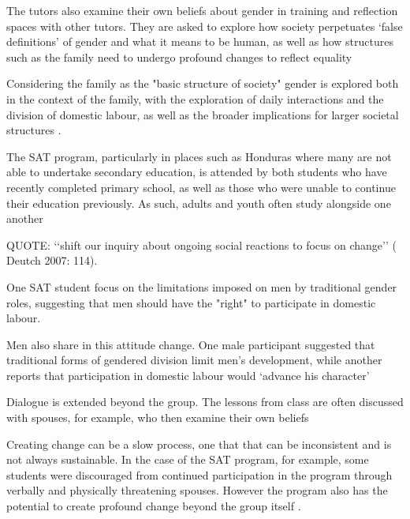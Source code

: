 The tutors also examine their own beliefs about gender in training and reflection spaces with other tutors. They are asked to explore how society perpetuates `false definitions' of gender and what it means to be human, as well as how structures such as the family need to undergo profound changes to reflect equality \citep{Murphy-Graham2009}

Considering the family as the "basic structure of society" gender is explored both in the context of the family, with the exploration of daily interactions and the division of domestic labour, as well as the broader implications for larger societal structures \citep{Murphy-Graham2009}.

The SAT program, particularly in places such as Honduras where many are not able to undertake secondary education, is attended by both students who have recently completed primary school, as well as those who were unable to continue their education previously. As such, adults and youth often study alongside one another \citep{Murphy-Graham2009}

QUOTE: ‘‘shift our inquiry about ongoing social reactions to focus on change’’ ( Deutch 2007: 114). \citep{Murphy-Graham2009}

One SAT student focus on the limitations imposed on men by traditional gender roles, suggesting that men should have the "right" to participate in domestic labour. \citep{Murphy-Graham2009}

Men also share in this attitude change. One male participant suggested that traditional forms of gendered division limit men's development, while another reports that participation in domestic labour would `advance his character' \citep{Murphy-Graham2009} \citep{Murphy-Graham2009}

Dialogue is extended beyond the group. The lessons from class are often discussed with spouses, for example, who then examine their own beliefs \citep{Murphy-Graham2009}

Creating change can be a slow process, one that that can be inconsistent and is not always sustainable. In the case of the SAT program, for example, some students were discouraged from continued participation in the program through verbally and physically threatening spouses. However the program also has the potential to create profound change beyond the group itself \citep{Murphy-Graham2009}.
